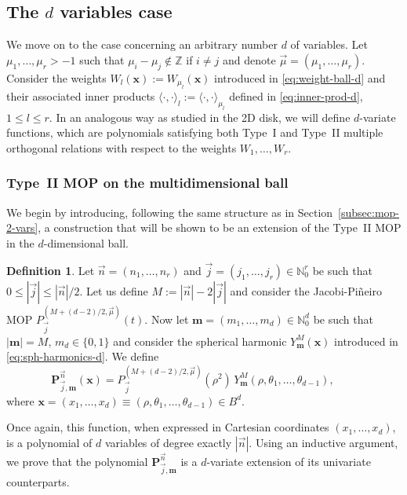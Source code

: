 \documentclass[a4paper]{article}
\theoremstyle{plain}
\theoremstyle{definition}
\newtheorem{definition}[theorem]{Definition}
\newcommand{\NN}{\mathbb{N}}
\begin{document}
    \subsection{The $d$ variables case}

    We move on to the case concerning an arbitrary number $d$ of variables. Let $\mu_1,\dots,\mu_r>-1$ such that $\mu_i-\mu_j\not\in\mathbb Z$ if $i\neq j$ and denote $\vec \mu =(\mu_1,\dots,\mu_r)$. Consider the weights $W_l(\mathbf x):=W_{\mu_l}(\mathbf x)$ introduced in \eqref{eq:weight-ball-d} and their associated inner products $\langle\cdot,\cdot\rangle_l := \langle\cdot,\cdot\rangle_{\mu_l}$ defined in \eqref{eq:inner-prod-d}, $1\leq l\leq r$. In an analogous way as studied in the 2D disk, we will define $d$-variate functions, which are polynomials satisfying both Type~I and Type~II multiple orthogonal relations with respect to the weights $W_1,\dots,W_r$.

    \subsubsection{Type~II MOP on the multidimensional ball}

    We begin by introducing, following the same structure as in Section~\ref{subsec:mop-2-vars}, a construction that will be shown to be an extension of the Type~II MOP in the $d$-dimensional ball.

    \begin{definition}
        Let $\vec n = (n_1,\dots,n_r)$ and $ \vec j = (j_1,\dots,j_r)\in\NN_0^r$ be such that $0\leq |\vec j| \leq |\vec n|/2$. Let us define $M:=|\vec n|-2|\vec j|$ and consider the Jacobi-Pi\~neiro MOP $P_{\vec j}^{(M+(d-2)/2,\vec \mu)}(t)$. Now let $\mathbf m =(m_1,\dots,m_d)\in\NN^d_0$ be such that $|\mathbf m|=M$, $m_d\in\{0,1\}$ and consider the spherical harmonic $Y_{\mathbf m}^{M}(\mathbf x)$ introduced in \eqref{eq:sph-harmonics-d}. We define
        \begin{equation}
            \label{eq:MOP-d-variables}
            \mathbf{P}_{\vec j,\mathbf m}^{\vec n}(\mathbf x) = P_{\vec j}^{(M+(d-2)/2,\vec \mu)}(\rho^2)\,Y_{\mathbf m}^{M}(\rho,\theta_1,\dots,\theta_{d-1}), \qquad
        \end{equation}
        where $\mathbf x=(x_1,\dots,x_d)\equiv(\rho,\theta_1,\dots,\theta_{d-1})\in B^d$.
    \end{definition}

    Once again, this function, when expressed in Cartesian coordinates $(x_1,\dots,x_d)$, is a polynomial of $d$ variables of degree exactly $|\vec n|$. Using an inductive argument, we prove that the polynomial $\mathbf{P}_{\vec j,\mathbf m}^{\vec n}$ is a $d$-variate extension of its univariate counterparts.
\end{document}
